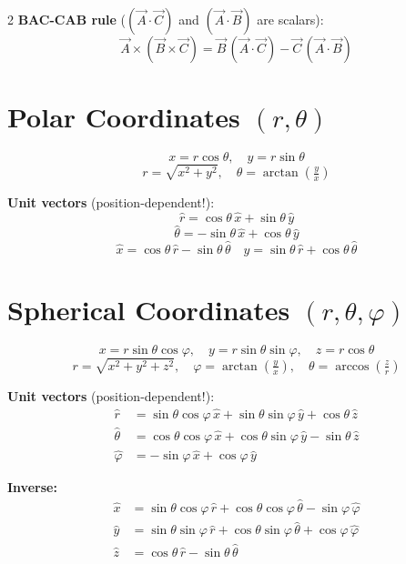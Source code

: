 \documentclass[9pt,a4paper]{article}
\begin{document}
\begin{multicols}{2}
\textbf{BAC-CAB rule} ($(\vec{A}\cdot\vec{C})$ and $(\vec{A}\cdot\vec{B})$ are scalars):
\[
  \vec{A}\times(\vec{B}\times\vec{C}) = \vec{B}\,(\vec{A}\cdot\vec{C}) - \vec{C}\,(\vec{A}\cdot\vec{B})
\]

\section{Polar Coordinates $(r,\theta)$}

\[
  x = r\cos\theta, \quad y = r\sin\theta
\]
\[
  r = \sqrt{x^2+y^2}, \quad \theta = \arctan\!\left(\tfrac{y}{x}\right)
\]

\textbf{Unit vectors} (position-dependent!):
\[
  \hat{r} = \cos\theta\,\hat{x}+\sin\theta\,\hat{y}
\]
\[
  \hat{\theta} = -\sin\theta\,\hat{x}+\cos\theta\,\hat{y}
\]
\[
  \hat{x} = \cos\theta\,\hat{r}-\sin\theta\,\hat{\theta}
  \quad
  \hat{y} = \sin\theta\,\hat{r}+\cos\theta\,\hat{\theta}
\]

\section{Spherical Coordinates $(r,\theta,\varphi)$}

\[
  x = r\sin\theta\cos\varphi,\quad
  y = r\sin\theta\sin\varphi,\quad
  z = r\cos\theta
\]
\[
  r = \sqrt{x^2+y^2+z^2},\quad
  \varphi = \arctan\!\left(\tfrac{y}{x}\right),\quad
  \theta = \arccos\!\left(\tfrac{z}{r}\right)
\]

\textbf{Unit vectors} (position-dependent!):
\begin{align*}
  \hat{r}      &= \sin\theta\cos\varphi\,\hat{x}+\sin\theta\sin\varphi\,\hat{y}+\cos\theta\,\hat{z}\\
  \hat{\theta} &= \cos\theta\cos\varphi\,\hat{x}+\cos\theta\sin\varphi\,\hat{y}-\sin\theta\,\hat{z}\\
  \hat{\varphi}&= -\sin\varphi\,\hat{x}+\cos\varphi\,\hat{y}
\end{align*}

\textbf{Inverse:}
\begin{align*}
  \hat{x} &= \sin\theta\cos\varphi\,\hat{r}+\cos\theta\cos\varphi\,\hat{\theta}-\sin\varphi\,\hat{\varphi}\\
  \hat{y} &= \sin\theta\sin\varphi\,\hat{r}+\cos\theta\sin\varphi\,\hat{\theta}+\cos\varphi\,\hat{\varphi}\\
  \hat{z} &= \cos\theta\,\hat{r}-\sin\theta\,\hat{\theta}
\end{align*}

\end{multicols}
\end{document}
